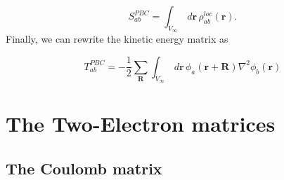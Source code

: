 \commentoutA{\documentclass[prb,aps,twocolumn,showpacs,twocolumngrid,superbib]{revtex4}}
\begin{document}
\begin{equation}
\label{Sab_pbc_3}
S_{ab}^{PBC}=\int _{V_{\infty }}\, d{\mathbf{r}}\, \rho ^{loc}_{ab}({\mathbf{r}}).
\end{equation}
Finally, we can rewrite the kinetic energy matrix as

\begin{equation}
\label{Tab_pbc}
T^{PBC}_{ab}=-\frac{1}{2}\sum _{\mathbf{R}}\int _{V_{\infty }}\, d{\mathbf{r}}\, \phi _{a}({\mathbf{r}+\mathbf{R}})\nabla ^{2}\phi _{b}({\mathbf{r}})
\end{equation}



\section{The Two-Electron matrices}


\subsection{The Coulomb matrix}
\end{document}
